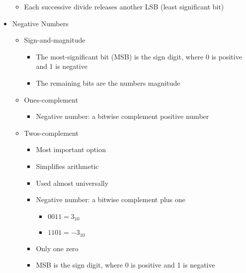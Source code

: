 \begin{itemize}
\begin{itemize}
      \item Each successive divide releases another LSB (least significant bit)

    \end{itemize}

  \item Negative Numbers

    \begin{itemize}

      \item Sign-and-magnitude

        \begin{itemize}

          \item The most-significant bit (MSB) is the sign digit, where 0 is positive and 1 is negative

          \item The remaining bits are the numbers magnitude

        \end{itemize}

      \item Ones-complement

        \begin{itemize}

          \item Negative number: a bitwise complement positive number

        \end{itemize}

      \item Twos-complement

        \begin{itemize}

          \item Most important option

          \item Simplifies arithmetic

          \item Used almost universally
            
          \item Negative number: a bitwise complement plus one

            \begin{itemize}

              \item $0011=3_{10}$

              \item $1101=-3_{10}$

            \end{itemize}

          \item Only one zero

          \item MSB is the sign digit, where 0 is positive and 1 is negative

        \end{itemize}

    \end{itemize}

\end{itemize}




